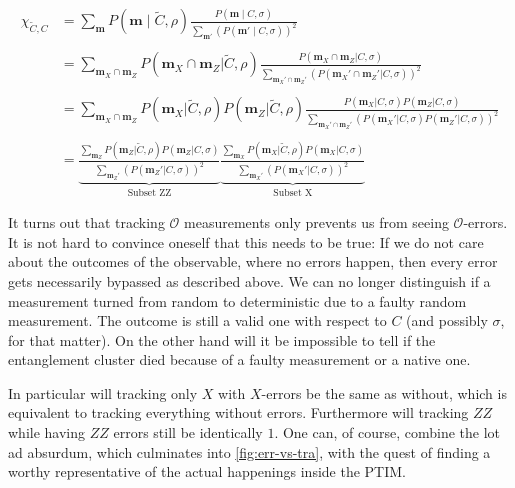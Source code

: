 \begin{align}
      \label{eq:lxe-subset-err}
      \chi_{\tilde{C},C} &= \sum_{\mathbf{m}} P(\mathbf{m} \mid \tilde{C}, \rho) \frac{P(\mathbf{m} \mid
      C, \sigma)}{\sum_{\mathbf{m}'}\left(P(\mathbf{m}' \mid
      C, \sigma)\right)^2} \nonumber\\
      \nonumber\\
      &= \sum_{\mathbf{m}_X \cap \mathbf{m}_Z} P(\mathbf{m}_X \cap \mathbf{m}_Z |
        \tilde{C}, \rho) \frac{P(\mathbf{m}_X \cap \mathbf{m}_Z| C,
        \sigma)}{\sum_{\mathbf{m}_X' \cap \mathbf{m}_Z'} \left(P(\mathbf{m}_X' \cap
        \mathbf{m}_Z'|C,\sigma)\right)^2}\nonumber\\
        \nonumber\\
      &= \sum_{\mathbf{m}_X \cap \mathbf{m}_Z} P(\mathbf{m}_X | \tilde{C}, \rho) P(
        \mathbf{m}_Z | \tilde{C}, \rho) \frac{P(\mathbf{m}_X | C, \sigma) P( \mathbf{m}_Z|
        C, \sigma)}{\sum_{\mathbf{m}_X' \cap \mathbf{m}_Z'}
          \left(P(\mathbf{m}_X' | C,
        \sigma) P( \mathbf{m}_Z'|C,\sigma)\right)^2}\nonumber\\
        \nonumber\\
      &= \underbrace{\frac{\sum_{\mathbf{m}_Z} P(\mathbf{m}_Z | \tilde{C}, \rho)
          P(\mathbf{m}_Z | C, \sigma)}{\sum_{\mathbf{m}_Z'}
          \left(P(\mathbf{m}_Z' |
          C, \sigma)\right)^2}}_{\text{Subset ZZ}}
          \underbrace{\frac{\sum_{\mathbf{m}_X} P(\mathbf{m}_X | \tilde{C}, \rho)
          P(\mathbf{m}_X | C, \sigma)}{\sum_{\mathbf{m}_X'}
          \left(P(\mathbf{m}_X' |
          C, \sigma)\right)^2}}_{\text{Subset X}}
\end{align}

It turns out that tracking $\mathcal{O}$ measurements only prevents us from
seeing $\mathcal{O}$-errors. It is not hard to convince oneself that this needs to
be true: If we do not care about the outcomes of the observable, where no errors
happen, then every error gets necessarily bypassed as described above. We can
no longer distinguish if a measurement turned from random to deterministic due
to a faulty random measurement. The outcome is still a valid one with respect to
$C$ (and possibly $\sigma$, for that matter). On the other hand will it be
impossible to tell if the entanglement cluster died because of a faulty
measurement or a native one. 

In particular will tracking only $X$ with $X$-errors be the same as without, which
is equivalent to tracking everything without errors. Furthermore will tracking
$ZZ$ while having $ZZ$ errors still be identically $1$. One can, of course,
combine the lot ad absurdum, which culminates into \cref{fig:err-vs-tra}, with
the quest of finding a worthy representative of the actual happenings inside
the PTIM.

